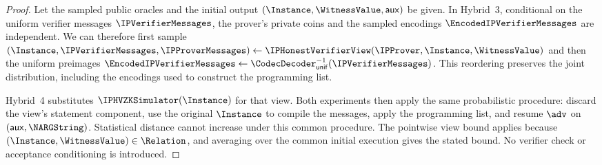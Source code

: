 \begin{proof}
  Let the sampled public oracles and the initial output \((\Instance,\WitnessValue,\mathsf{aux})\) be given. In Hybrid~3, conditional on the uniform verifier messages \(\IPVerifierMessages\), the prover's private coins and the sampled encodings \(\EncodedIPVerifierMessages\) are independent. We can therefore first sample \((\Instance,\IPVerifierMessages,\IPProverMessages)\leftarrow \IPHonestVerifierView(\IPProver,\Instance,\WitnessValue)\) and then the uniform preimages \(\EncodedIPVerifierMessages\leftarrow\CodecDecoder^{-1}_{\mathsf{unif}}(\IPVerifierMessages)\). This reordering preserves the joint distribution, including the encodings used to construct the programming list.

  Hybrid~4 substitutes \(\IPHVZKSimulator(\Instance)\) for that view. Both experiments then apply the same probabilistic procedure: discard the view's statement component, use the original \(\Instance\) to compile the messages, apply the programming list, and resume \(\adv\) on \((\mathsf{aux},\NARGString)\). Statistical distance cannot increase under this common procedure. The pointwise view bound applies because \((\Instance,\WitnessValue)\in\Relation\), and averaging over the common initial execution gives the stated bound. No verifier check or acceptance conditioning is introduced.
  \leanok
\end{proof}
